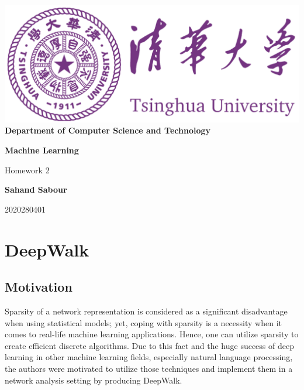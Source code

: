 \documentclass[12pt,a4paper]{article}
\begin{document}
	\begin{titlepage}
		\begin{center}
			\includegraphics[scale=.4]{Figures/Cover}\\
			\vspace{1cm}
			\bf{ \large {Department of Computer Science and Technology} }
		\end{center}
		
		\vspace{4cm}
		\centering
		\textbf{\Huge Machine Learning}
		\vspace{.5cm}
		
		{\Large Homework 2}

		\vspace{4cm}
		
		\textbf{\LARGE Sahand Sabour}
		
		
		
		\vspace{0.5cm}
		
		{\large 2020280401}
		
		
		\vfill
		
	\end{titlepage}

	\section{DeepWalk}
	
	\subsection{Motivation}
	\noindent Sparsity of a network representation is considered as a significant disadvantage when using statistical models; yet, coping with sparsity is a necessity when it comes to real-life machine learning applications. Hence, one can utilize sparsity to create efficient discrete algorithms. Due to this fact and the huge success of deep learning in other machine learning fields, especially natural language processing, the authors were motivated to utilize those techniques and implement them in a network analysis setting by producing DeepWalk.
	
\end{document}
